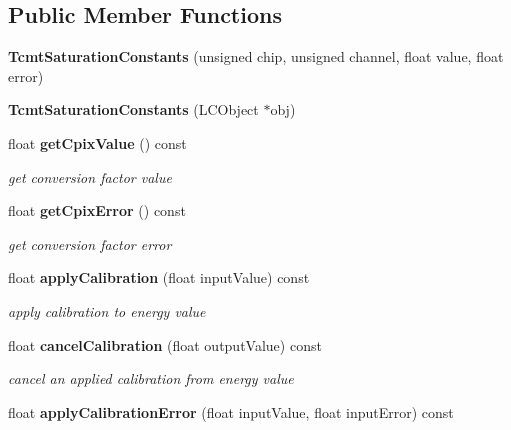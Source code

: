 \subsection*{Public Member Functions}
\begin{DoxyCompactItemize}
\item 
{\bfseries TcmtSaturationConstants} (unsigned chip, unsigned channel, float value, float error)\label{classCALICE_1_1TcmtSaturationConstants_a0fda0990cb0fe3a38739584411e64a87}

\item 
{\bfseries TcmtSaturationConstants} (LCObject $\ast$obj)\label{classCALICE_1_1TcmtSaturationConstants_abaffbcb4fd0af3d9152c5dea75316bf5}

\item 
float {\bf getCpixValue} () const \label{classCALICE_1_1TcmtSaturationConstants_af9835522fd68a4f67efd90a02082cc76}

\begin{DoxyCompactList}\small\item\em get conversion factor value \item\end{DoxyCompactList}\item 
float {\bf getCpixError} () const \label{classCALICE_1_1TcmtSaturationConstants_add6f57e7924d554ec4954ba11f0469cf}

\begin{DoxyCompactList}\small\item\em get conversion factor error \item\end{DoxyCompactList}\item 
float {\bf applyCalibration} (float inputValue) const \label{classCALICE_1_1TcmtSaturationConstants_a7a6e4f80607f938d3a739bf2527f3a56}

\begin{DoxyCompactList}\small\item\em apply calibration to energy value \item\end{DoxyCompactList}\item 
float {\bf cancelCalibration} (float outputValue) const \label{classCALICE_1_1TcmtSaturationConstants_a4aeddf593c38c241ab1a299dcafe3e3e}

\begin{DoxyCompactList}\small\item\em cancel an applied calibration from energy value \item\end{DoxyCompactList}\item 
float {\bf applyCalibrationError} (float inputValue, float inputError) const \label{classCALICE_1_1TcmtSaturationConstants_a256def068f131f98cb3a62669cc4dcaa}


\end{DoxyCompactItemize}

